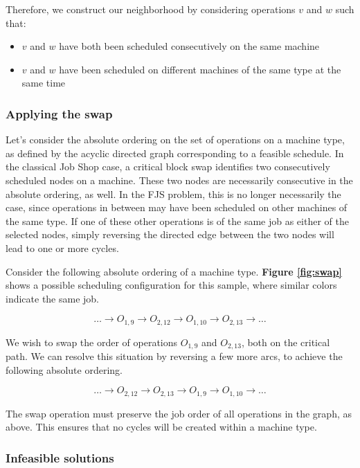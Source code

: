 \documentclass[a4paper,10pt]{article}
\begin{document}
Therefore, we construct our neighborhood by considering operations $v$ and $w$ such that:

\begin{itemize}
	\item $v$ and $w$ have both been scheduled consecutively on the same machine
	\item $v$ and $w$ have been scheduled on different machines of the same type at the same time
\end{itemize}

\subsubsection{Applying the swap}

Let's consider the absolute ordering on the set of operations on a machine type, as defined by the acyclic directed graph corresponding to a feasible schedule. In the classical Job Shop case, a critical block swap identifies two consecutively scheduled nodes on a machine. These two nodes are necessarily consecutive in the absolute ordering, as well. In the FJS problem, this is no longer necessarily the case, since operations in between may have been scheduled on other machines of the same type. If one of these other operations is of the same job as either of the selected nodes, simply reversing the directed edge between the two nodes will lead to one or more cycles.

Consider the following absolute ordering of a machine type. \textbf{Figure \ref{fig:swap}} shows a possible scheduling configuration for this sample, where similar colors indicate the same job.

\[ \dots \rightarrow O_{1,9} \rightarrow O_{2,12} \rightarrow O_{1,10} \rightarrow O_{2,13} \rightarrow \dots \]

We wish to swap the order of operations $O_{1,9}$ and $O_{2,13}$, both on the critical path. We can resolve this situation by reversing a few more arcs, to achieve the following absolute ordering.

\[ \dots \rightarrow O_{2,12} \rightarrow O_{2,13} \rightarrow O_{1,9} \rightarrow O_{1,10} \rightarrow \dots \]

The swap operation must preserve the job order of all operations in the graph, as above. This ensures that no cycles will be created within a machine type.

\subsubsection{Infeasible solutions}
\end{document}
